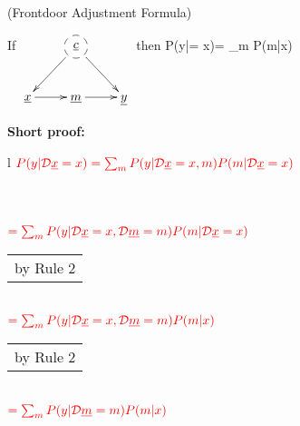 \begin{claim} (Frontdoor
Adjustment Formula)
\label{cl-frontdoor-proof}

If 
$
\xymatrix{
&*++[F-o]{\rvc}\ar[ld]\ar[rd]
\\
\rvx\ar[r]&\rvm\ar[r]&\rvy
}$
then
\beq
P(y|\cald \rvx = x)=
\sum_m
P(m|x)
\eeq

\beq
{}
\eeq
\end{claim}

\proof


{\bf * Short proof:}
\\
\begin{longtable}{l}
$\color{red}
P(y|{\cal D}{\underline{x}}=x)=
\sum_m 
P(y|{\cal D}{\underline{x}}=x, m)
P(m|{\cal D}{\underline{x}}=x)$
\\
\\
\xymatrix{\\=}
\\
\\
$\color{red}=
\sum_m 
P(y|{\cal D}{\underline{x}}=x, {\cal D}{\underline{m}}=m)
P(m|{\cal D}{\underline{x}}=x)$
\\
\begin{tabular}{l}
\\
by Rule 2
\end{tabular}
\\
$\color{red}=
\sum_m 
P(y|{\cal D}{\underline{x}}=x, {\cal D}{\underline{m}}=m)
P(m| x)$
\\
\begin{tabular}{l}
\\
by Rule 2
\end{tabular}
\\
$\color{red}=
\sum_m 
P(y|{\cal D}{\underline{m}}=m)
P(m|x)$
\\
\begin{tabular}{l}

\end{tabular}
\end{longtable}
